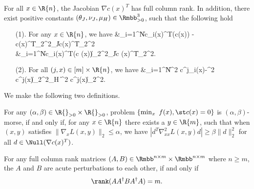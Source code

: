   \bassumption
 \label{ass.bounded.distribute}
 For all $x\in\R{n}$, the Jacobian $\nabla c(x)^T$ has full column rank. In addition, there exist positive constants $(
\theta_J,\nu_J,\mu_H
 )\in\Rmbb_{>0}^3$, 
 such that the following hold
 \begin{itemize}
 	\item[(1).]
 	For any $x\in\R{n}$, we have
 	\bequationNN
 	\baligned
 	&\sum_{i=1}^N\left\|\nabla c_i(x)^T\Rcal\left(\nabla c(x)\right) -\nabla c(x)^T\right\|_2^2\le \theta_J\|\nabla c(x)^T\|_2^2\\
 	&\sum_{i=1}^N\left\|\nabla c_i(x)^T\Ncal\left(\nabla c (x)\right)\right\|_2^2\le \nu_J\|\nabla c (x)^T\|_2^2.
 	\ealigned
 	\eequationNN
 	\item[(2).] 
 	For all $(j,x)\in[m]\times\R{n}$, 
 	we have  
 	\bequationNN
 	\baligned
 	&\sum_{i=1}^N\left\|\nabla^2 c^j_i(x)-\nabla^2 c^j(x)\right\|_2^2\le \mu_H \|\nabla^2 c^j(x)\|_2^2.
 	 	\ealigned
 	\eequationNN
  \end{itemize} 
\eassumption
  
  We make the following two definitions.
  \begin{definition}
\label{def.constraint.morse}
For any $(\alpha,\beta)\in\R{}_{>0}\times\R{}_{>0}$, problem $\{\min_x\ f(x),\st c(x)=0\}$ is $(\alpha,\beta)$-morse, if and only if, for any $x\in\R{n}$ there exists a $y\in\R{m}$, such that
	when $(x,y)$ satisfies $\|\nabla_x L(x,y)\|_2\le\alpha$, we have $|d^T\nabla^2_{xx}L(x,y)d|\ge\beta\|d\|_2^2$ for all $d\in\Null(\nabla c(x)^T)$.
\end{definition}
  
  \begin{definition}
	\label{def.acute.perturb}
	For any full column rank matrices $(A,B)\in\Rmbb^{n\times m}\times\Rmbb^{n\times m}$ where $n\ge m$, the $A$ and $B$ are acute perturbations to each other, if and only if
	\[
	\rank(AA^\dag BA^\dag A)=m.
	\]
\end{definition}

